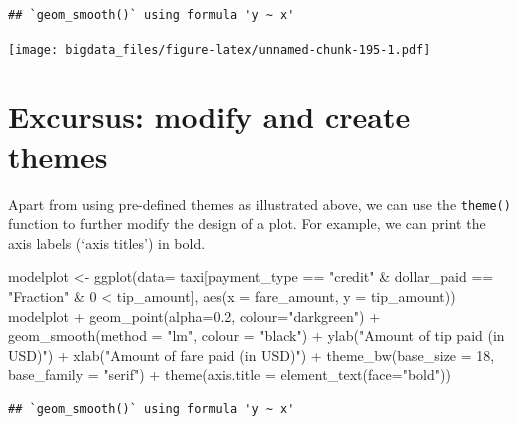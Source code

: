 \documentclass[
  12pt,
]{style/krantz}
\newenvironment{Shaded}{\begin{snugshade}}{\end{snugshade}}
\newcommand{\AttributeTok}[1]{\textcolor[rgb]{0.77,0.63,0.00}{#1}}
\newcommand{\DecValTok}[1]{\textcolor[rgb]{0.00,0.00,0.81}{#1}}
\newcommand{\FloatTok}[1]{\textcolor[rgb]{0.00,0.00,0.81}{#1}}
\newcommand{\FunctionTok}[1]{\textcolor[rgb]{0.00,0.00,0.00}{#1}}
\newcommand{\NormalTok}[1]{#1}
\newcommand{\OtherTok}[1]{\textcolor[rgb]{0.56,0.35,0.01}{#1}}
\newcommand{\SpecialCharTok}[1]{\textcolor[rgb]{0.00,0.00,0.00}{#1}}
\newcommand{\StringTok}[1]{\textcolor[rgb]{0.31,0.60,0.02}{#1}}
\begin{document}
\begin{verbatim}
## `geom_smooth()` using formula 'y ~ x'
\end{verbatim}

\texttt{[image: bigdata\_files/figure-latex/unnamed-chunk-195-1.pdf]}

\hypertarget{excursus-modify-and-create-themes}{%
\section{Excursus: modify and create themes}\label{excursus-modify-and-create-themes}}

Apart from using pre-defined themes as illustrated above, we can use the \texttt{theme()} function to further modify the design of a plot. For example, we can print the axis labels (`axis titles') in bold.

\begin{Shaded}
\begin{Highlighting}[]
\NormalTok{modelplot }\OtherTok{\textless{}{-}} \FunctionTok{ggplot}\NormalTok{(}\AttributeTok{data=}\NormalTok{ taxi[payment\_type }\SpecialCharTok{==} \StringTok{"credit"} \SpecialCharTok{\&}\NormalTok{ dollar\_paid }\SpecialCharTok{==} \StringTok{"Fraction"} \SpecialCharTok{\&} \DecValTok{0} \SpecialCharTok{\textless{}}\NormalTok{ tip\_amount],}
                    \FunctionTok{aes}\NormalTok{(}\AttributeTok{x =}\NormalTok{ fare\_amount, }\AttributeTok{y =}\NormalTok{ tip\_amount))}
\NormalTok{modelplot }\SpecialCharTok{+}
     \FunctionTok{geom\_point}\NormalTok{(}\AttributeTok{alpha=}\FloatTok{0.2}\NormalTok{, }\AttributeTok{colour=}\StringTok{"darkgreen"}\NormalTok{) }\SpecialCharTok{+}
     \FunctionTok{geom\_smooth}\NormalTok{(}\AttributeTok{method =} \StringTok{"lm"}\NormalTok{, }\AttributeTok{colour =} \StringTok{"black"}\NormalTok{) }\SpecialCharTok{+}
     \FunctionTok{ylab}\NormalTok{(}\StringTok{"Amount of tip paid (in USD)"}\NormalTok{) }\SpecialCharTok{+}
     \FunctionTok{xlab}\NormalTok{(}\StringTok{"Amount of fare paid (in USD)"}\NormalTok{) }\SpecialCharTok{+}
     \FunctionTok{theme\_bw}\NormalTok{(}\AttributeTok{base\_size =} \DecValTok{18}\NormalTok{, }\AttributeTok{base\_family =} \StringTok{"serif"}\NormalTok{) }\SpecialCharTok{+}
     \FunctionTok{theme}\NormalTok{(}\AttributeTok{axis.title =} \FunctionTok{element\_text}\NormalTok{(}\AttributeTok{face=}\StringTok{"bold"}\NormalTok{))}
\end{Highlighting}
\end{Shaded}

\begin{verbatim}
## `geom_smooth()` using formula 'y ~ x'
\end{verbatim}
\end{document}
